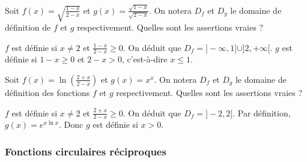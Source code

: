 \begin{question}

Soit $ f(x)= \sqrt{\frac{1-x}{2-x}} $ et $g(x)=\frac{\sqrt{1-x}}{\sqrt{2-x}}$. On notera $D_f$ et $D_g$ le domaine de définition de $f$ et $g$ respectivement. Quelles sont les assertions vraies ?
\begin{answers}
    \good{$D_f=]-\infty, 1] \cup ]2,+\infty[$}

    \bad{$D_f= [1,2[$}

    \good{$D_g=]-\infty, 1]$}

    \bad{$D_g=]-\infty, 2[$}
\end{answers}
\begin{explanations}
$f$ est définie  si $x\neq 2$ et $\frac{1-x}{2-x}\ge 0$. On déduit que 
$D_f=]-\infty, 1] \cup ]2,+\infty[$. $g$ est définie  si $1-x \ge 0$ et $2-x > 0$,  c'est-à-dire $x\le 1$. 
\end{explanations}

\end{question}







\begin{question} 

Soit $ f(x)= \ln(\frac{2+x}{2-x}) $ et $g(x)=x^x$. On notera $D_f$ et $D_g$ le domaine de définition des fonctions $f$ et $g$ respectivement. Quelles sont les assertions vraies ?
\begin{answers}

    \good{$D_f=]-2,2[$}


    \good{$D_g=]0,+\infty[$}
\end{answers}
\begin{explanations}
$f$ est définie  si $x\neq 2$ et $\frac{2+x}{2-x}\ge 0$. On déduit que 
 $D_f=]-2,2[$. Par définition, $g(x)=e^{x\ln x}$. Donc $g$ est définie si $x>0$.
\end{explanations}

\end{question}


\subsubsection{Fonctions circulaires réciproques}


